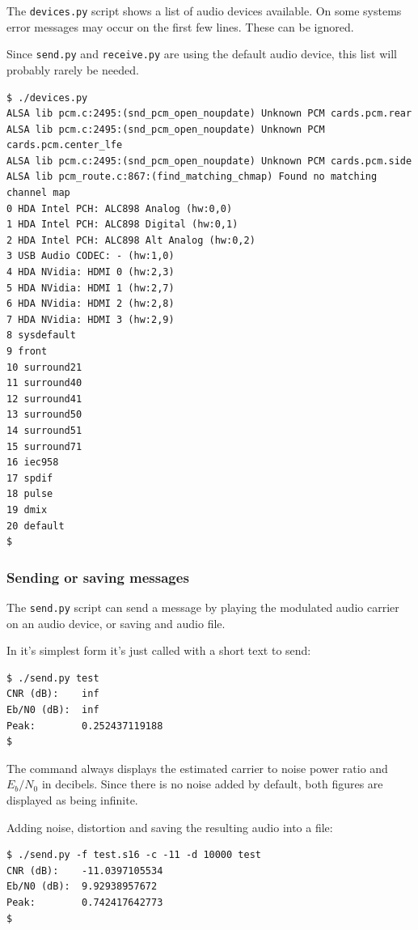 \documentclass[a4paper]{article}
\begin{document}
The \texttt{devices.py} script shows a list of audio devices available. 
On some systems error messages may occur on the first few lines. These 
can be ignored.

Since \texttt{send.py} and \texttt{receive.py} are using the default 
audio device, this list will probably rarely be needed.

\begin{lstlisting}
$ ./devices.py 
ALSA lib pcm.c:2495:(snd_pcm_open_noupdate) Unknown PCM cards.pcm.rear
ALSA lib pcm.c:2495:(snd_pcm_open_noupdate) Unknown PCM
cards.pcm.center_lfe
ALSA lib pcm.c:2495:(snd_pcm_open_noupdate) Unknown PCM cards.pcm.side
ALSA lib pcm_route.c:867:(find_matching_chmap) Found no matching
channel map
0 HDA Intel PCH: ALC898 Analog (hw:0,0)
1 HDA Intel PCH: ALC898 Digital (hw:0,1)
2 HDA Intel PCH: ALC898 Alt Analog (hw:0,2)
3 USB Audio CODEC: - (hw:1,0)
4 HDA NVidia: HDMI 0 (hw:2,3)
5 HDA NVidia: HDMI 1 (hw:2,7)
6 HDA NVidia: HDMI 2 (hw:2,8)
7 HDA NVidia: HDMI 3 (hw:2,9)
8 sysdefault
9 front
10 surround21
11 surround40
12 surround41
13 surround50
14 surround51
15 surround71
16 iec958
17 spdif
18 pulse
19 dmix
20 default
$
\end{lstlisting}

\subsubsection{Sending or saving messages}

The \texttt{send.py} script can send a message by playing the modulated
audio carrier on an audio device, or saving and audio file.

In it's simplest form it's just called with a short text to send:

\begin{lstlisting}
$ ./send.py test
CNR (dB):    inf
Eb/N0 (dB):  inf
Peak:        0.252437119188
$
\end{lstlisting}

The command always displays the estimated carrier to noise power ratio 
and $E_b/N_0$ in decibels. Since there is no noise added by default, 
both figures are displayed as being infinite.

Adding noise, distortion and saving the resulting audio into a file:

\begin{lstlisting}
$ ./send.py -f test.s16 -c -11 -d 10000 test
CNR (dB):    -11.0397105534
Eb/N0 (dB):  9.92938957672
Peak:        0.742417642773
$
\end{lstlisting}
\end{document}
